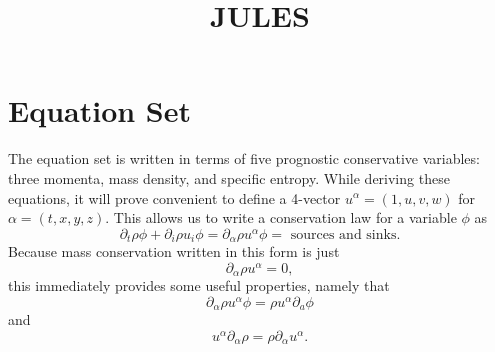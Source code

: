 \documentclass[11pt]{article}
\title{JULES}
\begin{document}
\maketitle

\section{Equation Set}

The equation set is written in terms of five prognostic conservative variables: three momenta, mass density, and specific entropy. While deriving these equations, it will prove convenient to define a 4-vector $u^\alpha = (1, u, v, w)$ for $\alpha = (t, x, y, z)$. This allows us to write a conservation law for a variable $\phi$ as
\begin{equation*}
\partial_t \rho \phi + \partial_i \rho u_i \phi = \partial_{\alpha} \rho u^{\alpha} \phi = \textrm{ sources and sinks}.
\end{equation*}
Because mass conservation written in this form is just
\begin{equation*}
\partial_\alpha \rho u^{\alpha} = 0,
\end{equation*}
this immediately provides some useful properties, namely that
\begin{equation*}
\partial_\alpha \rho u^{\alpha} \phi = \rho u^{\alpha} \partial_a \phi
\end{equation*}
and
\begin{equation*}
u^{\alpha} \partial_{\alpha} \rho = \rho \partial_{\alpha} u^{\alpha}.
\end{equation*}
\end{document}
